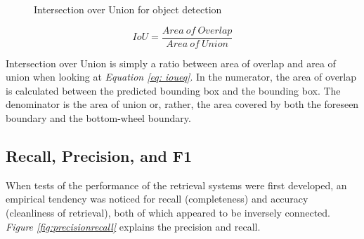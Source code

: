 \begin{figure}[h]
    \centering
    \hfill
    \caption{Intersection over Union for object detection \cite{rosebrock_intersection_2016}}
    \label{figure: iou}
\end{figure}

\begin{equation}
    IoU = \frac{Area\ of\ Overlap}{Area\ of\ Union} \label{eq: ioueq}
\end{equation}
\vspace{0.5cm}

Intersection over Union is simply a ratio between area of overlap and area of union when looking at \textit{Equation \ref{eq: ioueq}}.
In the numerator, the area of overlap is calculated between the predicted bounding box and the bounding box.
The denominator is the area of union or, rather, the area covered by both the foreseen boundary and the bottom-wheel boundary\cite{uavs_comparing_2019}.
\subsection{Recall, Precision, and F1}
When tests of the performance of the retrieval systems were first developed, an empirical tendency was noticed for recall (completeness) and accuracy (cleanliness of retrieval), both of which appeared to be inversely connected\cite{buckland_relationship_1994}. \textit{Figure \ref{fig:precisionrecall}} explains the precision and recall.



